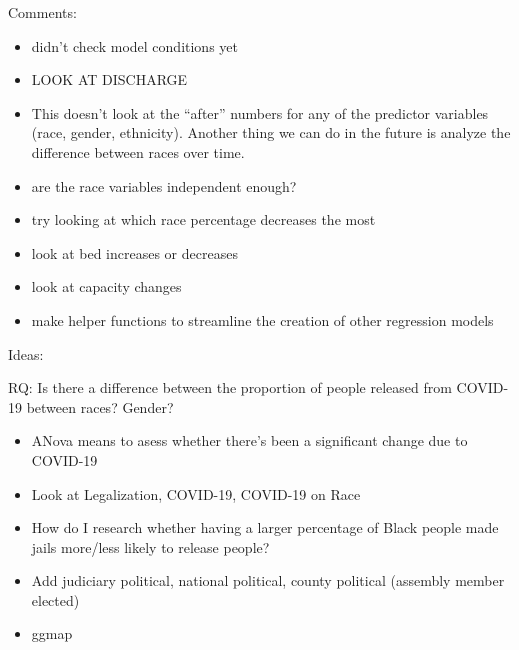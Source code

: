 \documentclass[
]{article}
\begin{document}
Comments:

\begin{itemize}
\item
  didn't check model conditions yet
\item
  LOOK AT DISCHARGE
\item
  This doesn't look at the ``after'' numbers for any of the predictor
  variables (race, gender, ethnicity). Another thing we can do in the
  future is analyze the difference between races over time.
\item
  are the race variables independent enough?
\item
  try looking at which race percentage decreases the most
\item
  look at bed increases or decreases
\item
  look at capacity changes
\item
  make helper functions to streamline the creation of other regression
  models
\end{itemize}

Ideas:

RQ: Is there a difference between the proportion of people released from
COVID-19 between races? Gender?

\begin{itemize}
\item
  ANova means to asess whether there's been a significant change due to
  COVID-19
\item
  Look at Legalization, COVID-19, COVID-19 on Race
\item
  How do I research whether having a larger percentage of Black people
  made jails more/less likely to release people?
\item
  Add judiciary political, national political, county political
  (assembly member elected)
\item
  ggmap
\end{itemize}
\end{document}
